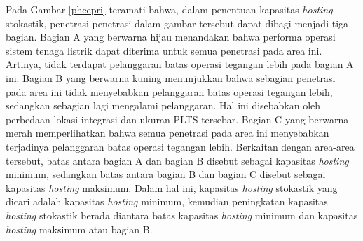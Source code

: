 {{Pada Gambar \ref{phcepri} teramati bahwa, dalam penentuan kapasitas \textit{hosting} stokastik, penetrasi-penetrasi dalam gambar tersebut dapat dibagi menjadi tiga bagian. Bagian A yang berwarna hijau menandakan bahwa performa operasi sistem tenaga listrik dapat diterima untuk semua penetrasi pada area ini. Artinya, tidak terdapat pelanggaran batas operasi tegangan lebih pada bagian A ini. Bagian B yang berwarna kuning menunjukkan bahwa sebagian penetrasi pada area ini tidak menyebabkan pelanggaran batas operasi tegangan lebih, sedangkan sebagian lagi mengalami pelanggaran. Hal ini disebabkan oleh perbedaan lokasi integrasi dan ukuran PLTS tersebar. Bagian C yang berwarna merah memperlihatkan bahwa semua penetrasi pada area ini menyebabkan terjadinya pelanggaran batas operasi tegangan lebih. Berkaitan dengan area-area tersebut, batas antara bagian A dan bagian B disebut sebagai kapasitas \textit{hosting} minimum, sedangkan batas antara bagian B dan bagian C disebut sebagai kapasitas \textit{hosting} maksimum. Dalam hal ini, kapasitas \textit{hosting} stokastik yang dicari adalah kapasitas \textit{hosting} minimum, kemudian peningkatan kapasitas \textit{hosting} stokastik berada diantara batas kapasitas \textit{hosting} minimum dan kapasitas \textit{hosting} maksimum atau bagian B.

}}
